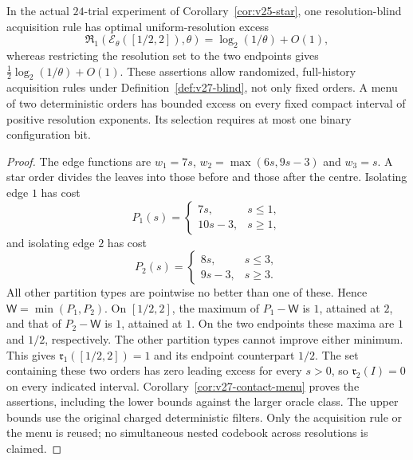 \begin{corollary}
\label{cor:v27-two-configurations}
In the actual $24$-trial experiment of Corollary~\ref{cor:v25-star}, one resolution-blind acquisition rule has optimal uniform-resolution excess
\[
 \mathfrak R_1(\mathcal E_\theta([1/2,2]),\theta)
                       =\log_2(1/\theta)+O(1),
\]
whereas restricting the resolution set to the two endpoints gives
$\tfrac12\log_2(1/\theta)+O(1)$. These assertions allow randomized, full-history acquisition rules under Definition~\ref{def:v27-blind}, not only fixed orders. A menu of two deterministic orders has bounded excess on every fixed compact interval of positive resolution exponents. Its selection requires at most one binary configuration bit.
\end{corollary}
\begin{proof}
The edge functions are $w_1=7s$, $w_2=\max(6s,9s-3)$ and $w_3=s$. A star order divides the leaves into those before and those after the centre. Isolating edge $1$ has cost
\[
 P_1(s)=\begin{cases}7s,&s\le1,\\10s-3,&s\ge1,\end{cases}
\]
and isolating edge $2$ has cost
\[
 P_2(s)=\begin{cases}8s,&s\le3,\\9s-3,&s\ge3.\end{cases}
\]
All other partition types are pointwise no better than one of these. Hence $\mathsf W=\min(P_1,P_2)$. On $[1/2,2]$, the maximum of $P_1-\mathsf W$ is $1$, attained at $2$, and that of $P_2-\mathsf W$ is $1$, attained at $1$. On the two endpoints these maxima are $1$ and $1/2$, respectively. The other partition types cannot improve either minimum. This gives $\mathfrak r_1([1/2,2])=1$ and its endpoint counterpart $1/2$. The set containing these two orders has zero leading excess for every $s>0$, so $\mathfrak r_2(I)=0$ on every indicated interval. Corollary~\ref{cor:v27-contact-menu} proves the assertions, including the lower bounds against the larger oracle class. The upper bounds use the original charged deterministic filters. Only the acquisition rule or the menu is reused; no simultaneous nested codebook across resolutions is claimed.
\end{proof}
